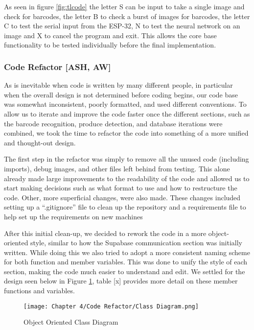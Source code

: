 As seen in figure \ref{fig:tlcode} the letter S can be input to take a single image and check for barcodes, the letter B to check a burst of images for barcodes, the letter C to test the serial input from the ESP-32, N to test the neural network on an image and X to cancel the program and exit.
This allows the core base functionality to be tested individually before the final implementation.

\subsubsection {Code Refactor [ASH, AW]}

As is inevitable when code is written by many different people, in particular when the overall design is not determined before coding begins, our code base was somewhat inconsistent, poorly formatted, and used different conventions.
To allow us to iterate and improve the code faster once the different sections, such as the barcode recognition, produce detection, and database iterations were combined, we took the time to refactor the code into something of a more unified and thought-out design.

The first step in the refactor was simply to remove all the unused code (including imports), debug images, and other files left behind from testing.
This alone already made large improvements to the readability of the code and allowed us to start making decisions such as what format to use and how to restructure the code.
Other, more superficial changes,  were also made. These changes included setting up a “.gitignore” file to clean up the repository and a requirements file to help set up the requirements on new machines

After this initial clean-up, we decided to rework the code in a more object-oriented style, similar to how the Supabase communication section was initially written.
While doing this we also tried to adopt a more consistent naming scheme for both function and member variables.
This was done to unify the style of each section, making the code much easier to understand and edit.
We settled for the design seen below in Figure \ref{fig:oocd}, table [x] provides more detail on these member functions and variables.

\begin{figure}[H]        
    \centering
    \texttt{[image: Chapter 4/Code Refactor/Class Diagram.png]}
    \caption{Object Oriented Class Diagram}
    \label{fig:oocd}
\end{figure} 

